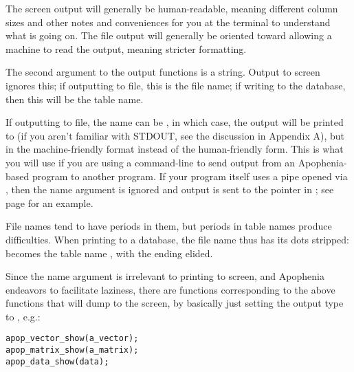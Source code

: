 The screen output will generally be human-readable, meaning different
column sizes and other notes and conveniences for you at the terminal to
understand what is going on. The file output will generally be oriented
toward allowing a machine to read the output, meaning stricter formatting.

The second argument to the output functions is a string.  Output to
screen ignores this; if outputting to file, this is the file name;
if writing to the database, then this will be the table name.


If outputting to file, the name can be , in which case,
the output will be printed to  (if you aren't familiar with STDOUT,
see the discussion in Appendix A), but in the machine-friendly format instead of
the human-friendly form.  This is what you will use if you are using a
command-line  to send output from an Apophenia-based program
to another program. If your program itself uses a pipe opened via
, then the name argument is ignored and output is sent to
the  pointer in ; see page
\pageref{pipeexample} for an example.


File names tend to have periods in them, but periods in table names
produce difficulties.  When printing to a database, the file name thus
has its dots stripped:  becomes the table name
, with the ending elided.

Since the name argument is irrelevant to printing to screen, and
Apophenia endeavors to facilitate laziness, there are functions
corresponding to the above  functions that will
dump to the screen, by basically just setting the output type to , e.g.:
 
\begin{lstlisting}
apop_vector_show(a_vector);
apop_matrix_show(a_matrix);
apop_data_show(data);
\end{lstlisting}

